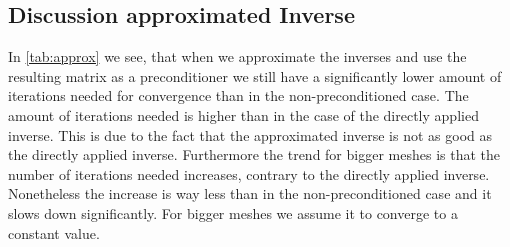 \subsection{Discussion approximated Inverse}
In \autoref{tab:approx} we see, that when we approximate the inverses and use the resulting matrix as a preconditioner we still have a significantly lower amount of iterations needed for convergence than in the non-preconditioned case. The amount of iterations needed is higher than in the case of the directly applied inverse. This is due to the fact that the approximated inverse is not as good as the directly applied inverse. Furthermore the trend for bigger meshes is that the number of iterations needed increases, contrary to the directly applied inverse. Nonetheless the increase is way less than in the non-preconditioned case and it slows down significantly. For bigger meshes we assume it to converge to a constant value.